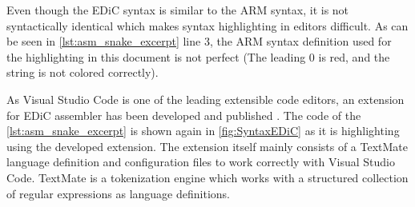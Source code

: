 Even though the \gls{EDiC} syntax is similar to the ARM syntax, it is not syntactically identical which makes syntax highlighting in editors difficult.
As can be seen in \cref{lst:asm_snake_excerpt} line 3, the ARM syntax definition used for the highlighting in this document is not perfect (The leading 0 is red, and the string is not colored correctly).

As Visual Studio Code \cite{VSCode} is one of the leading extensible code editors, an extension for \gls{EDiC} assembler has been developed and published \cite{VSCodeEDiC}.
The code of the \cref{lst:asm_snake_excerpt} is shown again in \cref{fig:SyntaxEDiC} as it is highlighting using the developed extension.
The extension itself mainly consists of a TextMate language definition \cite{TextMate} and configuration files to work correctly with Visual Studio Code.
TextMate is a tokenization engine which works with a structured collection of regular expressions as language definitions.